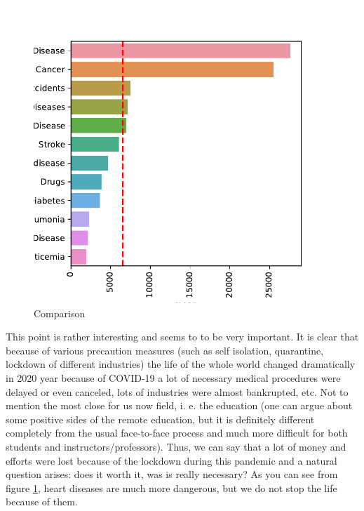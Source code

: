 \documentclass[conference]{IEEEtran}
\begin{document}
\begin{figure}
  \centering
  \includegraphics[width=0.9\columnwidth]{figs/yearly_deaths}
  \caption{Comparison}
  \label{fig:yearly_deaths}
\end{figure}


This point is rather interesting and seems to to be very  important. It is clear that because of various precaution measures (such as self isolation, quarantine, lockdown of different industries) the life of the whole world changed dramatically in 2020 year because of COVID-19 a lot of necessary medical procedures were delayed or even canceled, lots of industries were almost bankrupted, etc. Not to mention the most close for us now field, i. e. the education (one can argue about some positive sides of the remote education, but it is definitely different completely from the usual face-to-face process and much more difficult for both students and instructors/professors). Thus, we can say that a lot of money and efforts were lost because of the lockdown during this pandemic and a natural question arises: does it worth it, was is really necessary? As you can see from figure \ref{fig:yearly_deaths}, heart diseases are much more dangerous, but we do not stop the life because of them.
\end{document}
